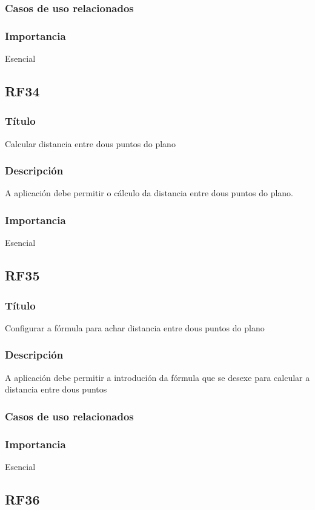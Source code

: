 \subsubsection{Casos de uso relacionados}
\subsubsection{Importancia}
Esencial

\subsection*{RF34}
\subsubsection{Título}
Calcular distancia entre dous puntos do plano
\subsubsection{Descripción}
A aplicación debe permitir o cálculo da distancia entre dous puntos do plano.
\subsubsection{Importancia}
Esencial

\subsection*{RF35}
\subsubsection{Título}
Configurar a fórmula para achar distancia entre dous puntos do plano
\subsubsection{Descripción}
A aplicación debe permitir a introdución da fórmula que se desexe para calcular a distancia entre dous puntos
\subsubsection{Casos de uso relacionados}
\subsubsection{Importancia}
Esencial

\subsection*{RF36}
